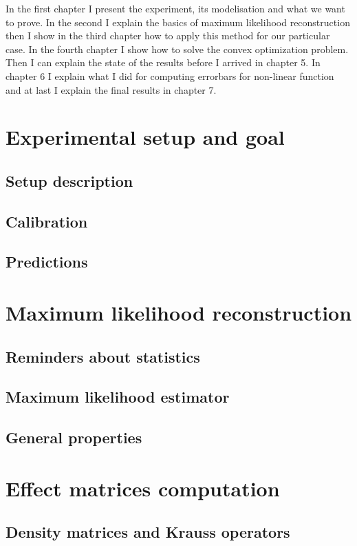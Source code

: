 \documentclass[10pt]{report}
\begin{document}
In the first chapter I
present the experiment, its modelisation and what we want to prove. In the
second I explain the basics of maximum likelihood reconstruction then I show in
the third chapter how to apply this method for our particular case. In the
fourth chapter I show how to solve the convex optimization problem. Then I can
explain the state of the results before I arrived in chapter 5. In chapter 6 I
explain what I did for computing errorbars for non-linear function and at last
I explain the final results in chapter 7.


\chapter{Experimental setup and goal}
\section{Setup description}
\section{Calibration}
\section{Predictions}


\chapter{Maximum likelihood reconstruction}
\section{Reminders about statistics}
\section{Maximum likelihood estimator}
\section{General properties}

\chapter{Effect matrices computation}
\section{Density matrices and Krauss operators}
\end{document}
